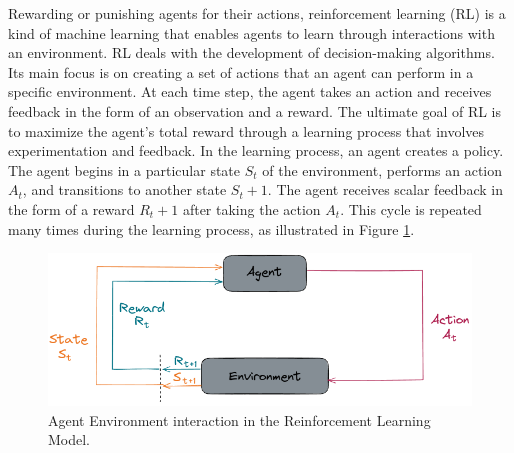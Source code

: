 \documentclass[12pt,oneside]{article}
\begin{document}
Rewarding or punishing agents for their actions, reinforcement learning (RL) is a kind of machine learning that enables agents to learn through interactions with an environment. RL deals with the development of decision-making algorithms. Its main focus is on creating a set of actions that an agent can perform in a specific environment. At each time step, the agent takes an action and receives feedback in the form of an observation and a reward. The ultimate goal of RL is to maximize the agent's total reward through a learning process that involves experimentation and feedback. 
In the learning process, an agent creates a policy. The agent begins in a particular state $S_t$ of the environment, performs an action $A_t$, and transitions to another state $S_t+1$. The agent receives scalar feedback in the form of a reward $R_t+1$ after taking the action $A_t$. This cycle is repeated many times during the learning process, as illustrated in Figure \ref{fig:mdp1}.
\begin{figure}[H]
\centering
\includegraphics[width=0.7\linewidth]{mdp1}
\caption{Agent Environment interaction in the Reinforcement Learning Model.}
\label{fig:mdp1}
\end{figure}
\end{document}
